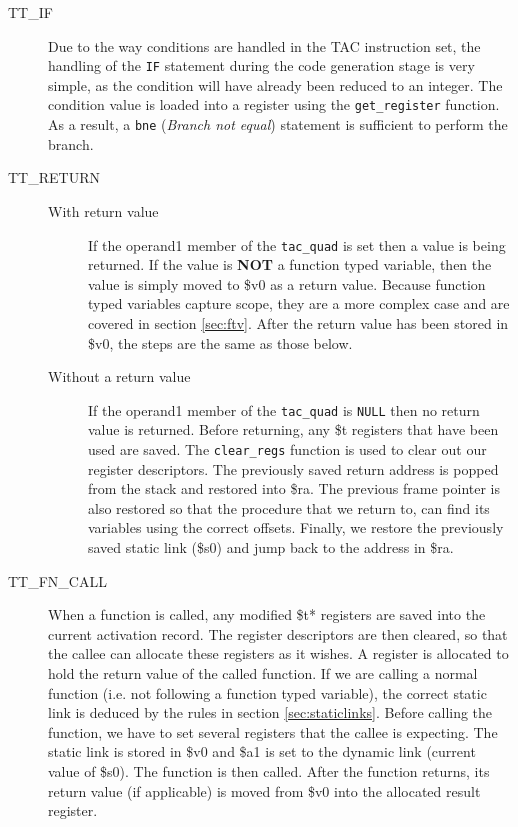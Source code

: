 \begin{description}
	\item[TT\_IF] Due to the way conditions are handled in the TAC instruction set, the handling of the \verb!IF! statement during the code generation stage is very simple, as the condition will have already been reduced to an integer. The condition value is loaded into a register using the \verb!get_register! function. As a result, a \verb!bne! (\emph{Branch not equal}) statement is sufficient to perform the branch.
	\item[TT\_RETURN]
		\begin{description}
			\item[With return value] If the operand1 member of the \verb!tac_quad! is set then a value is being returned. If the value is \textbf{NOT} a function typed variable, then the value is simply moved to \$v0 as a return value. Because function typed variables capture scope, they are a more complex case and are covered in section \ref{sec:ftv}. After the return value has been stored in \$v0, the steps are the same as those below.
			\item[Without a return value] If the operand1 member of the \verb!tac_quad! is \verb!NULL! then no return value is returned. Before returning, any \$t registers that have been used are saved. The \verb!clear_regs! function is used to clear out our register descriptors. The previously saved return address is popped from the stack and restored into \$ra. The previous frame pointer is also restored so that the procedure that we return to, can find its variables using the correct offsets. Finally, we restore the previously saved static link (\$s0) and jump back to the address in \$ra.
		\end{description}
	\item[TT\_FN\_CALL] When a function is called, any modified \$t* registers are saved into the current activation record. The register descriptors are then cleared, so that the callee can allocate these registers as it wishes. A register is allocated to hold the return value of the called function. If we are calling a normal function (i.e. not following a function typed variable), the correct static link is deduced by the rules in section \ref{sec:staticlinks}. Before calling the function, we have to set several registers that the callee is expecting. The static link is stored in \$v0 and \$a1 is set to the dynamic link (current value of \$s0). The function is then called. After the function returns, its return value (if applicable) is moved from \$v0 into the allocated result register.
	\ \\ \ \\

\end{description}
